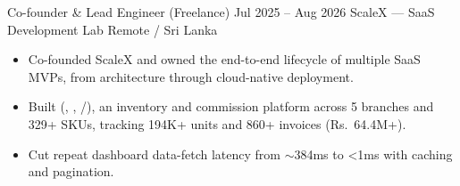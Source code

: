 \CVExperienceEntry
{Co-founder \& Lead Engineer (Freelance)}
{Jul 2025 -- Aug 2026}
{ScaleX --- SaaS Development Lab}
{Remote / Sri Lanka}
\begin{itemize}[leftmargin=*, itemsep=0.2em, topsep=0.1em]
  \item Co-founded ScaleX and owned the end-to-end lifecycle of multiple SaaS MVPs, from architecture through cloud-native deployment.
  \item Built  (, , /\allowbreak{}), an inventory and commission platform across 5 branches and 329+ SKUs, tracking 194K+ units and 860+ invoices (Rs.~64.4M+).
  \item Cut repeat dashboard data-fetch latency from $\sim$384ms to <1ms with  caching and pagination.
\end{itemize}

